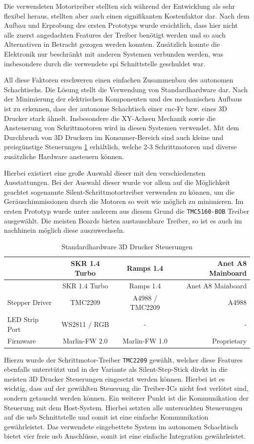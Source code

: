Die verwendeten Motortreiber stellten sich während der Entwicklung als
sehr flexibel heraus, stellten aber auch einen signifikanten
Kostenfaktor dar. Nach dem Aufbau und Erprobung des ersten Prototyps
wurde ersichtlich, dass hier nicht alle zuerst angedachten Features der
Treiber benötigt werden und so auch Alternativen in Betracht gezogen
werden konnten. Zusätzlich konnte die Elektronik nur beschränkt mit
anderen Systemen verbunden werden, was insbesondere durch die verwendete
\gls{spi} Schnittstelle geschuldet war.

All diese Faktoren erschweren einen einfachen Zusammenbau des autonomen
Schachtischs. Die Lösung stellt die Verwendung von Standardhardware dar.
Nach der Minimierung der elektrischen Komponenten und des mechanischen
Aufbaus ist zu erkennen, dass der autonome Schachtisch einer
\gls{cnc}-Fr bzw. eines 3D Drucker stark ähnelt. Insbesondere die
XY-Achsen Mechanik sowie die Ansteuerung von Schrittmotoren wird in
diesen Systemen verwendet. Mit dem Durchbruch von 3D Druckern im
Konsumer-Bereich sind auch kleine und preisgünstige Steuerungen
\ref{3dmarlinctl} erhältlich, welche 2-3 Schrittmotoren und diverse
zusätzliche Hardware ansteuern können.

Hierbei existiert eine große Auswahl dieser mit den verschiedensten
Ausstattungen. Bei der Auswahl dieser wurde vor allem auf die
Möglichkeit geachtet sogenannte Silent-Schrittmotortreiber verwenden zu
können, um die Geräuschimmissionen durch die Motoren so weit wie möglich
zu minimieren. Im ersten Prototyp wurde unter anderem aus diesem Grund
die \passthrough{\lstinline!TMC5160-BOB!} Treiber ausgewählt. Die
meisten Boards bieten austauschbare Treiber, so ist es auch im
nachhinein möglich diese auszuwechseln.

\begin{longtable}[]{@{}lccr@{}}
\caption{Standardhardware 3D Drucker Steuerungen
\label{3dmarlinctl}}\tabularnewline
\toprule
& SKR 1.4 Turbo & Ramps 1.4 & Anet A8 Mainboard\tabularnewline
\midrule
\endfirsthead
\toprule
& SKR 1.4 Turbo & Ramps 1.4 & Anet A8 Mainboard\tabularnewline
\midrule
\endhead
Stepper Driver & TMC2209 & A4988 / TMC2209 & A4988\tabularnewline
LED Strip Port & WS2811 / RGB & - & -\tabularnewline
Firmware & Marlin-FW 2.0 & Marlin-FW 1.0 & Proprietary\tabularnewline
\bottomrule
\end{longtable}

Hierzu wurde der Schrittmotor-Treiber \passthrough{\lstinline!TMC2209!}
gewählt, welcher diese Features ebenfalls unterstützt und in der
Variante als Silent-Step-Stick direkt in die meisten 3D Drucker
Steuerungen eingesetzt werden können. Hierbei ist es wichtig, dass auf
der gewählten Steuerung die Treiber-ICs nicht fest verlötet sind,
sondern getauscht werden können. Ein weiterer Punkt ist die
Kommunikation der Steuerung mit dem Host-System. Hierbei setzten alle
untersuchten Steuerungen auf die \gls{usb} Schnittstelle und somit ist
eine einfache Kommunikation gewährleistet. Das verwendete eingebettete
System im autonomen Schachtisch bietet vier freie \gls{usb} Anschlüsse,
somit ist eine einfache Integration gewährleistet.

